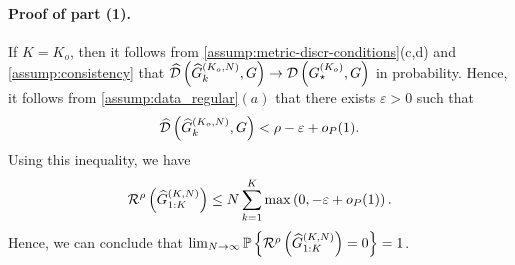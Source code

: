 \paragraph{Proof of part (1).} 
If $K=K_{o}$, then it follows from \cref{assump:metric-discr-conditions}(c,d) and \cref{assump:consistency} that $\widehat{\mathcal{D}}\left(\widehat{G}^{(K_{o},N)}_{k},G\right)\to\mathcal{D}\left(G^{(K_{o})}_{\star}, G\right)$ in probability.
Hence, it follows from \cref{assump:data_regular}$(a)$ that there exists $\varepsilon>0$ such that
\[
	\widehat{\mathcal{D}}\left(\widehat{G}^{(K_{o},N)}_{k},G\right)<\rho-\varepsilon+o_{P}(1).
\]
Using this inequality, we have
\[
	\mathcal{R}^{\rho}\left(\widehat{G}^{(K,N)}_{1:K}\right)
	\leq N\sum^{K}_{k=1}\mathop{\mathrm{max}}\left(0, -\varepsilon+o_{P}(1)\right).
\]
Hence, we can conclude that
$\lim_{N\to\infty}\mathbb{P}\left\{\mathcal{R}^{\rho}\left(\widehat{G}^{(K,N)}_{1:K}\right)=0\right\}=1$.


